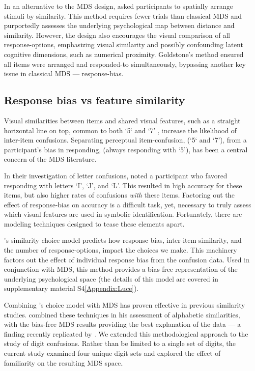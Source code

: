 In an alternative to the MDS design,  asked participants to spatially arrange stimuli by similarity. This method requires fewer trials than classical MDS and purportedly assesses the underlying psychological map between distance and similarity. However, the design also encourages the visual comparison of all response-options, emphasizing visual similarity and possibly confounding latent cognitive dimensions, such as numerical proximity. Goldstone's method ensured all items were arranged and responded-to simultaneously, bypassing another key issue in classical MDS --- response-bias.

\subsection{Response bias vs feature similarity}
Visual similarities between items and shared visual features, such as a straight horizontal line on top, common to both `5` and `7' , increase the likelihood of inter-item confusions. Separating perceptual item-confusion, (\eg `5` and `7'), from a participant's bias in responding, (\eg always responding with `5'), has been a central concern of the MDS literature.

In their investigation of letter confusions,  noted a participant who favored responding with letters `I', `J', and `L'. This resulted in high accuracy for these items, but also higher rates of confusions \textit{with} these items. Factoring out the effect of response-bias on accuracy is a difficult task, yet, necessary to truly assess which visual features are used in symbolic identification. Fortunately, there are modeling techniques designed to tease these elements apart.

\citeauthor{luce1963detection}'s \citeyear{luce1963detection} similarity choice model predicts how response bias, inter-item similarity, and the number of response-options, impact the choices we make. This machinery factors out the effect of individual response bias from the confusion data. Used in conjunction with MDS, this method provides a bias-free representation of the underlying psychological space (the details of this model are covered in supplementary material S4\ref{Appendix:Luce}). 

Combining \citeauthor{luce1963detection}'s \citeyear{luce1963detection} choice model with MDS has proven effective in previous similarity studies.  combined these techniques in his assessment of alphabetic similarities, with the bias-free MDS results providing the best explanation of the data --- a finding recently replicated by . We extended this methodological approach to the study of digit confusions. Rather than be limited to a single set of digits, the current study examined four unique digit sets and explored the effect of familiarity on the resulting MDS space. 

